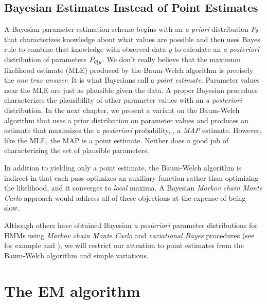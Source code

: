 \subsection{Bayesian Estimates Instead of Point Estimates}
\label{sec:EstWholeDist}

A Bayesian parameter estimation scheme begins with an \emph{a priori}
distribution $P_{\theta}$ that characterizes knowledge about what
values are possible and then uses Bayes rule to combine that knowledge
with observed data $y$ to calculate an \emph{a posteriori}
distribution of parameters $P_{\theta\mid y}$.  We don't really
believe that the maximum likelihood estimate (MLE) produced by the
Baum-Welch algorithm is precisely the \emph{one true answer}.  It is
what Bayesians call a \emph{point estimate}.  Parameter values near
the MLE are just as plausible given the data.  A proper Bayesian
procedure characterizes the plausibility of other parameter values
with an \emph{a posteriori} distribution.  In the next chapter, we
present a variant on the Baum-Welch algorithm that uses a prior
distribution on parameter values and produces an estimate that
maximizes the \emph{a posteriori} probability, \ie, a \emph{MAP}
estimate.  However, like the MLE, the MAP is a point estimate.
Neither does a good job of characterizing the set of plausible
parameters.

In addition to yielding only a point estimate, the Baum-Welch
algorithm is indirect in that each pass optimizes an auxiliary
function rather than optimizing the likelihood, and it converges to
\emph{local} maxima.  A Bayesian \emph{Markov chain Monte Carlo}
approach would address all of these objections at the expense of being
slow.

Although others have obtained Bayesian \emph{a posteriori} parameter
distributions for HMMs using \emph{Markov chain Monte Carlo} and
\emph{variational Bayes} procedures (see for example \cite{Rosales04}
and \cite{Beal03}), we will restrict our attention to point estimates
from the Baum-Welch algorithm and simple variations.


\section{The EM algorithm}
\label{sec:EM}
%
%

